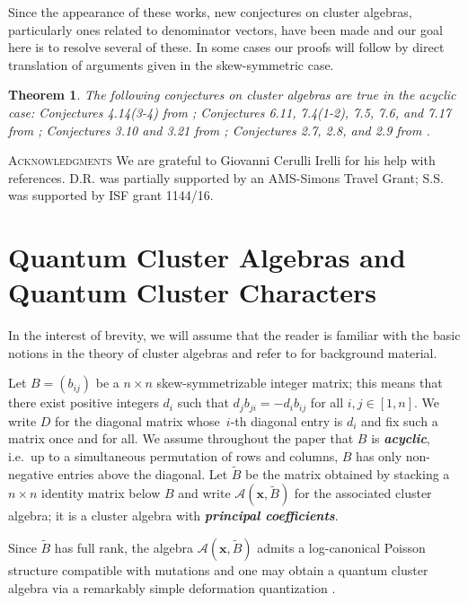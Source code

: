 \documentclass[12pt]{amsart}
\newtheorem{theorem}{Theorem}
\newcommand{\bfx}{\mathbf{x}}
\newcommand{\cA}{\mathcal{A}}
\newcommand{\newword}[1]{\textbf{\emph{#1}}}
\begin{document}
  Since the appearance of these works, new conjectures on cluster algebras, particularly ones related to denominator vectors, have been made and our goal here is to resolve several of these.
  In some cases our proofs will follow by direct translation of arguments given in the skew-symmetric case. 
  \begin{theorem}
    \label{thm:main}
    The following conjectures on cluster algebras are true in the acyclic case: Conjectures 4.14(3-4) from \cite{FZ03}; Conjectures 6.11, 7.4(1-2), 7.5, 7.6, and 7.17 from \cite{fomin-zelevinsky4}; Conjectures 3.10 and 3.21 from \cite{reading-speyer}; Conjectures 2.7, 2.8, and 2.9 from \cite{reading-stella}.
  \end{theorem}

\textsc{Acknowledgments}
  We are grateful to Giovanni Cerulli Irelli for his help with references.
  D.R. was partially supported by an AMS-Simons Travel Grant; S.S. was supported by ISF grant 1144/16.


\section{Quantum Cluster Algebras and Quantum Cluster Characters}
\label{sec:qca}
  
  In the interest of brevity, we will assume that the reader is familiar with the basic notions in the theory of cluster algebras and refer to \cite{fomin-zelevinsky4} for background material.

  Let $B=(b_{ij})$ be a $n\times n$ skew-symmetrizable integer matrix; this means that there exist positive integers $d_i$ such that $d_jb_{ji}=-d_ib_{ij}$ for all $i,j\in[1,n]$. 
  We write $D$ for the diagonal matrix whose~$i$-th diagonal entry is $d_i$ and fix such a matrix once and for all.
  We assume throughout the paper that $B$ is \newword{acyclic}, i.e.\ up to a simultaneous permutation of rows and columns, $B$ has only non-negative entries above the diagonal.
  Let $\widetilde{B}$ be the matrix obtained by stacking a $n\times n$ identity matrix below $B$ and write $\cA(\bfx,\widetilde{B})$ for the associated cluster algebra; it is a cluster algebra with \newword{principal coefficients}.

  Since $\widetilde{B}$ has full rank, the algebra $\cA(\bfx,\widetilde{B})$ admits a log-canonical Poisson structure compatible with mutations \cite{gekhtman-shapiro-vainshtein} and one may obtain a quantum cluster algebra via a remarkably simple deformation quantization \cite{berenstein-zelevinsky}.  
\end{document}
